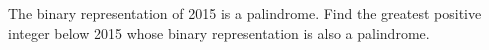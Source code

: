 The binary representation of 2015 is a palindrome. Find the greatest positive integer below 2015 whose binary representation is also a palindrome.
